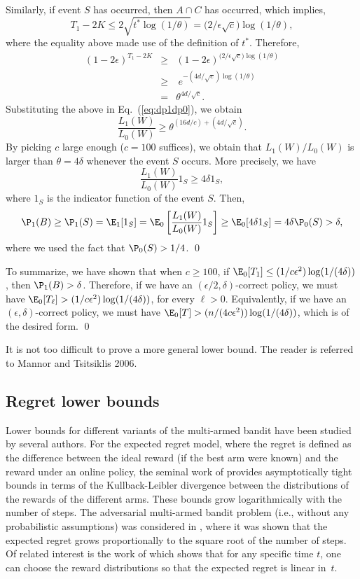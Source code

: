 Similarly, if event $S$ has occurred, then $A\cap C$ has occurred,
which implies,
$$T_1 -2 K\le 2 \sqrt{t^* \log(1/\theta)}=\big(2/\epsilon\sqrt{c}\big) \log(1/\theta),$$
where the equality above made use of the definition of $t^*$. Therefore,
\begin{eqnarray*}
(1-2 \epsilon)^{T_1-2K} & \ge & (1-2 \epsilon)^{\big(2/\epsilon\sqrt{c}\big) \log(1/\theta)}
\\ &\ge& \ e^{-(4d/\sqrt{c})\log(1/\theta)} \\
&=&\theta^{4d/\sqrt{c}}.
\end{eqnarray*}
Substituting the above in Eq.~(\ref{eq:dp1dp0}), we obtain
$$
\frac{L_1(W)}{L_0(W)} \ge \theta ^{({16d}/{c}) + ({4d}/{\sqrt{c}})}.
$$
By picking $c$ large enough ($c=100$ suffices), we obtain that $L_1(W)/{L_0(W)}$ is larger than
$\theta=4\delta$ whenever the event $S$ occurs. More precisely, we have
$$\frac{L_1(W)}{L_0(W)} 1_S \geq 4\delta 1_S,$$
where $1_S$ is the indicator function of the event $S$. Then,
$$
\P_1(B) \ge \P_1 (S) = \E_1[  1_{S}] = \E_0\left[
\frac{L_1(W)}{L_0(W)} 1_{S} \right]\geq \E_0 [4\delta 1_{S}] =
4\delta \P_0(S) > \delta,
$$
where we used the fact that $\P_0(S)>1/4$.
\qed

To summarize, we have shown that when $c\geq 100$,
if
$\E_0[T_1]\leq(1/c\epsilon^2)\log(1/(4\delta))$, then
$\P_1(B)>\delta$. Therefore, if we have an
$(\epsilon/2,\delta)$-correct policy, we must have
$\E_0[T_\ell]> (1/c\epsilon^2)\log(1/(4\delta))$, for every $\ell>0$.
Equivalently, if we have an $(\epsilon,\delta)$-correct policy, we
must have $\E_0[T]>(n/(4c\epsilon^2))\log(1/(4\delta))$, which is of
the desired form. \qed

It is not too difficult to prove a more general lower bound. The reader is referred to Mannor and Tsitsiklis 2006.

\subsection{Regret lower bounds}
\label{sec:regretlowerbounds}

 Lower bounds for different variants
of the multi-armed bandit have been studied by several authors.
For the expected regret model, where the regret is defined as the
difference between the ideal reward (if the best arm were known)
and the reward  under an online policy, the seminal work of \cite{LR85}
provides asymptotically tight bounds in terms of the
Kullback-Leibler divergence between the distributions of the
rewards of the different arms. These bounds grow logarithmically
with the number of steps.
The adversarial multi-armed bandit
problem (i.e., without any probabilistic assumptions) was
considered in \cite{A95,ACFS02}, where it was shown that the
expected regret grows proportionally to the square root of the
number of steps. Of related interest is the work of \cite{KulkarniLugosi00}
which shows that for any specific time $t$, one can choose the reward distributions so
that the expected regret is linear in~$t$.



